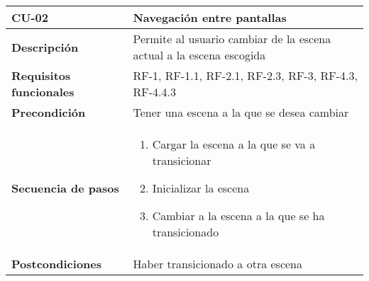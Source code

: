 \begin{longtable}{l|l}
\begin{minipage}{0.25\columnwidth}
\textbf{CU-02} 
\end{minipage}
&
\begin{minipage}{0.65\columnwidth}
Navegación entre pantallas
\end{minipage}
\\ \hline

\begin{minipage}{0.25\columnwidth}
\textbf{Descripción} 
\end{minipage}
&
\begin{minipage}{0.65\columnwidth}
Permite al usuario cambiar de la escena actual a la escena escogida
\end{minipage}
\\ \hline

\begin{minipage}{0.25\columnwidth}
\textbf{Requisitos funcionales} 
\end{minipage}
&
\begin{minipage}{0.65\columnwidth}
RF-1, RF-1.1, RF-2.1, RF-2.3, RF-3, RF-4.3, RF-4.4.3
\end{minipage}
\\ \hline

\begin{minipage}{0.25\columnwidth}
\textbf{Precondición} 
\end{minipage}
&
\begin{minipage}{0.65\columnwidth}
Tener una escena a la que se desea cambiar
\end{minipage}
\\ \hline

\begin{minipage}{0.25\columnwidth}
\textbf{Secuencia de pasos} 
\end{minipage}
&
\begin{minipage}{0.65\columnwidth}
\begin{enumerate}
\item
Cargar la escena a la que se va a transicionar
\item
Inicializar la escena
\item
Cambiar a la escena a la que se ha transicionado
\end{enumerate}
\end{minipage}
\\ \hline

\begin{minipage}{0.25\columnwidth}
\textbf{Postcondiciones} 
\end{minipage}
&
\begin{minipage}{0.65\columnwidth}
Haber transicionado a otra escena
\end{minipage}
\\ \hline


\end{longtable}

